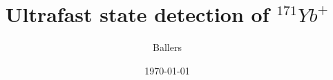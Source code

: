 \documentclass[preprint,superscriptaddress,amsmath,amssymb,aps,prl]{revtex4-1}
\begin{document}
 
\title{Ultrafast state detection of $^{171}Yb^+$}

\author{Ballers}



\date{\today}

\begin{abstract}
\end{abstract}

\maketitle


\begin{acknowledgments}
\end{acknowledgments}


\end{document}
